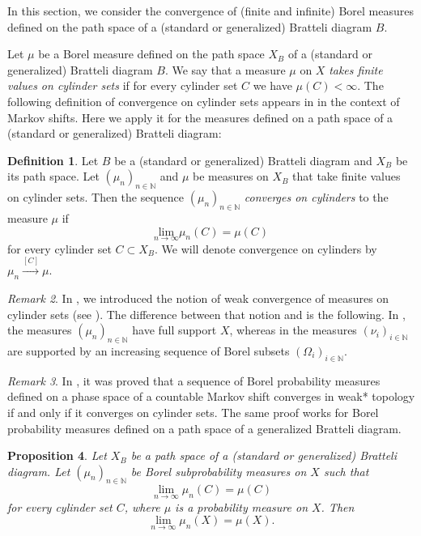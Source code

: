\documentclass[11pt,reqno]{amsart}
\theoremstyle{definition}
\newtheorem{definition}{Definition}[section]
\theoremstyle{remark}
\newtheorem{remark}[definition]{Remark}
\theoremstyle{plain}
\newtheorem{prop}[definition]{Proposition}
\newcommand{\N}{\mathbb N}
\numberwithin{equation}{section}
\begin{document}
In this section, we consider the convergence of (finite and infinite) Borel measures defined on the path space of a (standard or generalized) Bratteli diagram $B$.

Let $\mu$ be a Borel measure defined on the path space $X_B$ of a (standard or generalized) Bratteli diagram $B$. 
We say that a measure $\mu$ on $X$ \textit{takes finite values on cylinder sets} if for every cylinder set $C$ we have $\mu(C) < \infty$. The following definition of convergence on cylinder sets appears in \cite{Iommi_Veloso_2021} in the context of Markov shifts. Here we apply it for the measures defined on a path space of a (standard or generalized) Bratteli diagram:

\begin{definition} \cite[Definition 3.14]{Iommi_Veloso_2021} \label{def_conv_cyl_set} Let $B$ be a (standard or generalized) Bratteli diagram and $X_B$ be its path space. 
Let $(\mu_n)_{n \in \N}$ and $\mu$ be measures on $X_B$ that take finite values on cylinder sets. Then the sequence $(\mu_n)_{n \in \N}$ \textit{converges on cylinders} to the measure $\mu$ if $$
\underset{n\rightarrow \infty}{\textrm{lim}} \mu_n (C) = \mu (C)
$$ for every cylinder set $C \subset X_B$. We will denote convergence on cylinders by $\mu_n \xrightarrow{[C]} \mu$. \end{definition}

\begin{remark}
In , we introduced the notion of weak convergence of measures on cylinder sets (see ). The difference between that notion and  is the following. In , the measures $(\mu_n)_{n \in \N}$ have full support $X$, whereas in  the measures $(\nu_i)_{i \in \N}$ are supported by an increasing sequence of Borel subsets $(\Omega_i)_{i \in \N}$. 
\end{remark}

\begin{remark}
In \cite[Lemma 3.17]{Iommi_Veloso_2021}, it was proved that 
a sequence of Borel probability measures defined on a phase space of a countable Markov shift converges in weak* topology if and only if it converges on cylinder sets. The same proof works for Borel probability measures defined on a path space of a generalized Bratteli diagram. 
\end{remark}


\begin{prop}\label{prop_cyl_sets_conv_subprob}
Let $X_B$ be a path space of a (standard or generalized) Bratteli diagram.
Let $(\mu_n)_{n \in \N}$ be Borel subprobability measures on $X$ such that 
\[
\lim_{n \rightarrow \infty}\mu_n(C) = \mu(C)
\]
for every cylinder set $C$, where $\mu$ is a probability measure on $X$. Then 
\[
\lim_{n \rightarrow \infty}\mu_n(X) = \mu(X).
\]
\end{prop}
\end{document}
